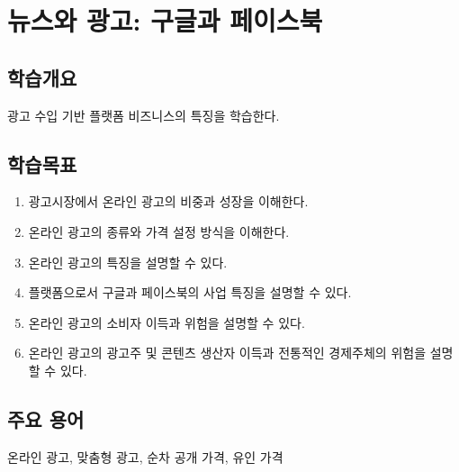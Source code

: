 \chapter{뉴스와 광고: 구글과 페이스북}\label{cha:newsandadvertisement}

\section*{학습개요}
광고 수입 기반 플랫폼 비즈니스의 특징을 학습한다.

\section*{학습목표}
\begin{enumerate}
\item 광고시장에서 온라인 광고의 비중과 성장을 이해한다.
\item 온라인 광고의 종류와 가격 설정 방식을 이해한다.
\item 온라인 광고의 특징을 설명할 수 있다.
\item 플랫폼으로서 구글과 페이스북의 사업 특징을 설명할 수 있다.
\item 온라인 광고의 소비자 이득과 위험을 설명할 수 있다.
\item 온라인 광고의 광고주 및 콘텐츠 생산자 이득과 전통적인 경제주체의 위험을 설명할 수 있다.
\end{enumerate}

\section*{주요 용어}
온라인 광고, 맞춤형 광고, 순차 공개 가격, 유인 가격

\pagebreak

